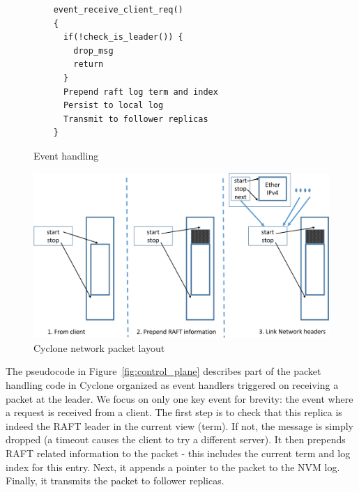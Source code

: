 \documentclass[letterpaper,twocolumn,10pt]{article}
\begin{document}
\begin{figure}
\begin{minipage}{.5\textwidth}
\scriptsize
\begin{verbatim}
    event_receive_client_req()
    {
      if(!check_is_leader()) {
        drop_msg
        return
      }
      Prepend raft log term and index
      Persist to local log
      Transmit to follower replicas
    }
\end{verbatim}
\caption{Event handling}
\label{fig:control_plane}
\end{minipage}
\begin{minipage}{.5\textwidth}
  \centering
  \includegraphics[scale=0.3]{figures2/network_packet.pdf}
  \caption{Cyclone network packet layout}
  \label{fig:packet_layout}
\end{minipage}
\end{figure}


The pseudocode in Figure~\ref{fig:control_plane} describes part of the
packet handling code in Cyclone organized as event handlers triggered
on receiving a packet at the leader. We focus on only one key event
for brevity: the event where a request is received from a client. The
first step is to check that this replica is indeed the RAFT leader in
the current view (term). If not, the message is simply dropped (a
timeout causes the client to try a different server). It then prepends
RAFT related information to the packet - this includes the current
term and log index for this entry. Next, it appends a pointer to the
packet to the NVM log. Finally, it transmits the packet to follower
replicas.
\end{document}
